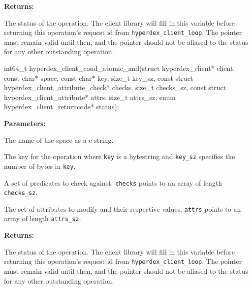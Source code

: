 \noindent\textbf{Returns:}
\begin{description}[labelindent=\widthof{{\texttt{status}}},leftmargin=*,noitemsep,nolistsep,align=right]
\item[\texttt{status}] The status of the operation.  The client library will fill in this variable before returning this operation's request id from \texttt{hyperdex\_client\_loop}.  The pointer must remain valid until then, and the pointer should not be aliased to the status for any other outstanding operation.
\end{description}

\funcsep
{}
\begin{ccode}
int64_t hyperdex_client_cond_atomic_and(struct hyperdex_client* client,
                const char* space,
                const char* key, size_t key_sz,
                const struct hyperdex_client_attribute_check* checks, size_t checks_sz,
                const struct hyperdex_client_attribute* attrs, size_t attrs_sz,
                enum hyperdex_client_returncode* status);
\end{ccode}
\funcdesc 

\noindent\textbf{Parameters:}
\begin{description}[labelindent=\widthof{{\texttt{checks}, \texttt{checks\_sz}}},leftmargin=*,noitemsep,nolistsep,align=right]
\item[\texttt{space}] The name of the space as a c-string.
\item[\texttt{key}, \texttt{key\_sz}] The key for the operation where \texttt{key} is a bytestring and \texttt{key\_sz} specifies the number of bytes in \texttt{key}.
\item[\texttt{checks}, \texttt{checks\_sz}] A set of predicates to check against.  \texttt{checks} points to an array of length \texttt{checks\_sz}.
\item[\texttt{attrs}, \texttt{attrs\_sz}] The set of attributes to modify and their respective values.  \texttt{attrs} points to an array of length \texttt{attrs\_sz}.
\end{description}

\noindent\textbf{Returns:}
\begin{description}[labelindent=\widthof{{\texttt{status}}},leftmargin=*,noitemsep,nolistsep,align=right]
\item[\texttt{status}] The status of the operation.  The client library will fill in this variable before returning this operation's request id from \texttt{hyperdex\_client\_loop}.  The pointer must remain valid until then, and the pointer should not be aliased to the status for any other outstanding operation.
\end{description}

